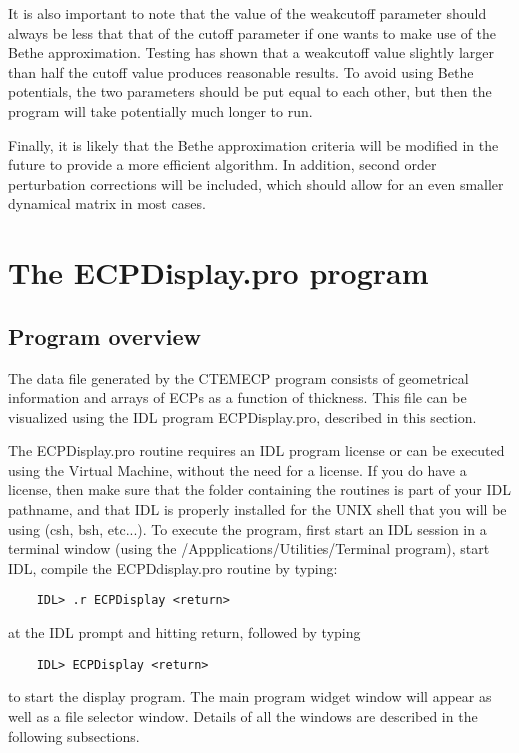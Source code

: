 \documentclass[DIV=calc, paper=letter, fontsize=11pt]{scrartcl}	 %
\begin{document}
It is also important to note that the value of the \textsf{weakcutoff} parameter should always be less that
that of the \textsf{cutoff} parameter if one wants to make use of the Bethe approximation.  Testing has shown
that a \textsf{weakcutoff} value slightly larger than half the \textsf{cutoff} value produces reasonable 
results.  To avoid using Bethe potentials, the two parameters should be put equal to each other, but then the 
program will take potentially much longer to run.

Finally, it is likely that the Bethe approximation criteria will be modified in the future to provide a more
efficient algorithm.  In addition, second order perturbation corrections will be included, which should allow
for an even smaller dynamical matrix in most cases.


\section{The \protect\textsf{ECPDisplay.pro} program\label{sec:idl}}

\subsection{Program overview\label{sec:idloverview}}
The data file generated by the \textsf{CTEMECP} program consists of geometrical information and arrays of ECPs 
as a function of thickness.  This file can be visualized using the IDL program
\textsf{ECPDisplay.pro}, described in this section.

The \textsf{ECPDisplay.pro} routine requires an IDL program license or can be executed using the Virtual Machine, without the need for a license. 
If you do have a license, then make sure that the folder containing the routines is part of your IDL pathname,
and that IDL is properly installed for the UNIX shell that you will be using (csh, bsh, etc...).
To execute the program, first start an IDL session in a terminal window (using the /Appplications/Utilities/Terminal program), 
start IDL, compile the \textsf{ECPDdisplay.pro} routine by typing:
\begin{verbatim}
	IDL> .r ECPDisplay <return>
\end{verbatim}
at the IDL prompt and hitting return, followed by typing 
\begin{verbatim}
	IDL> ECPDisplay <return>
\end{verbatim}
to start the display program.  The main program widget window will appear as well as a file selector window.  
Details of all the windows are described in the following subsections.
\end{document}
